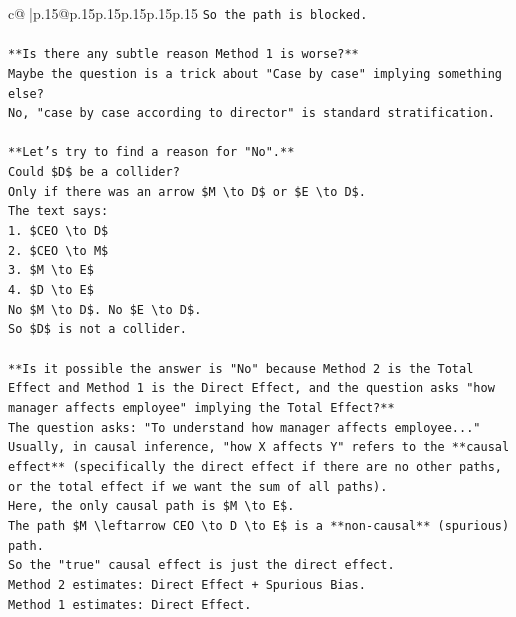 \documentclass{article}
\begin{document}
{\begin{supertabular}{c@{$\;$}|p{.15\linewidth}@{}p{.15\linewidth}p{.15\linewidth}p{.15\linewidth}p{.15\linewidth}p{.15\linewidth}}
{{{\texttt{So the path is blocked.} \\
\\ 
\texttt{**Is there any subtle reason Method 1 is worse?**} \\
\texttt{Maybe the question is a trick about "Case by case" implying something else?} \\
\texttt{No, "case by case according to director" is standard stratification.} \\
\\ 
\texttt{**Let's try to find a reason for "No".**} \\
\texttt{Could \$D\$ be a collider?} \\
\texttt{Only if there was an arrow \$M \textbackslash{}to D\$ or \$E \textbackslash{}to D\$.} \\
\texttt{The text says:} \\
\texttt{1. \$CEO \textbackslash{}to D\$} \\
\texttt{2. \$CEO \textbackslash{}to M\$} \\
\texttt{3. \$M \textbackslash{}to E\$} \\
\texttt{4. \$D \textbackslash{}to E\$} \\
\texttt{No \$M \textbackslash{}to D\$. No \$E \textbackslash{}to D\$.} \\
\texttt{So \$D\$ is not a collider.} \\
\\ 
\texttt{**Is it possible the answer is "No" because Method 2 is the Total Effect and Method 1 is the Direct Effect, and the question asks "how manager affects employee" implying the Total Effect?**} \\
\texttt{The question asks: "To understand how manager affects employee..."} \\
\texttt{Usually, in causal inference, "how X affects Y" refers to the **causal effect** (specifically the direct effect if there are no other paths, or the total effect if we want the sum of all paths).} \\
\texttt{Here, the only causal path is \$M \textbackslash{}to E\$.} \\
\texttt{The path \$M \textbackslash{}leftarrow CEO \textbackslash{}to D \textbackslash{}to E\$ is a **non{-}causal** (spurious) path.} \\
\texttt{So the "true" causal effect is just the direct effect.} \\
\texttt{Method 2 estimates: Direct Effect + Spurious Bias.} \\
\texttt{Method 1 estimates: Direct Effect.} \\
}}}
\end{supertabular}}
\end{document}
